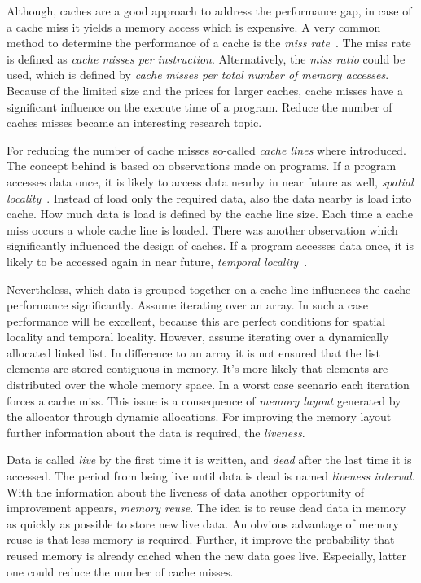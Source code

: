 \documentclass[onecolumn, openany, master, english, seal, signatures]{dbrgrptt}
\begin{document}
Although, caches are a good approach to address the performance gap, in case of a cache miss it yields a memory access which is expensive. A very common method to determine the performance of a cache is the \emph{miss rate}~\cite{patterson2011computer}. The miss rate is defined as \emph{cache misses per instruction}. Alternatively, the \emph{miss ratio} could be used, which is defined by \emph{cache misses per total number of memory accesses}. Because of the limited size and the prices for larger caches, cache misses have a significant influence on the execute time of a program. Reduce the number of caches misses became an interesting research topic.

For reducing the number of cache misses so-called \emph{cache lines} where introduced. The concept behind is based on observations made on programs. If a program accesses data once, it is likely to access data nearby in near future as well, \emph{spatial locality}~\cite{jacob2010memory}. Instead of load only the required data, also the data nearby is load into cache. How much data is load is defined by the cache line size. Each time a cache miss occurs a whole cache line is loaded. There was another observation which significantly influenced the design of caches. If a program accesses data once, it is likely to be accessed again in near future, \emph{temporal locality}~\cite{jacob2010memory}.

Nevertheless, which data is grouped together on a cache line influences the cache performance significantly. Assume iterating over an array. In such a case performance will be excellent, because this are perfect conditions for spatial locality and temporal locality. However, assume iterating over a dynamically allocated linked list. In difference to an array it is not ensured that the list elements are stored contiguous in memory. It's more likely that elements are distributed over the whole memory space. In a worst case scenario each iteration forces a cache miss. This issue is a consequence of \emph{memory layout} generated by the allocator through dynamic allocations. For improving the memory layout further information about the data is required, the \emph{liveness}.

Data is called \emph{live} by the first time it is written, and \emph{dead} after the last time it is accessed. The period from being live until data is dead is named \emph{liveness interval}. With the information about the liveness of data another opportunity of improvement appears, \emph{memory reuse}. The idea is to reuse dead data in memory as quickly as possible to store new live data. An obvious advantage of memory reuse is that less memory is required. Further, it improve the probability that reused memory is already cached when the new data goes live. Especially, latter one could reduce the number of cache misses.
\end{document}

